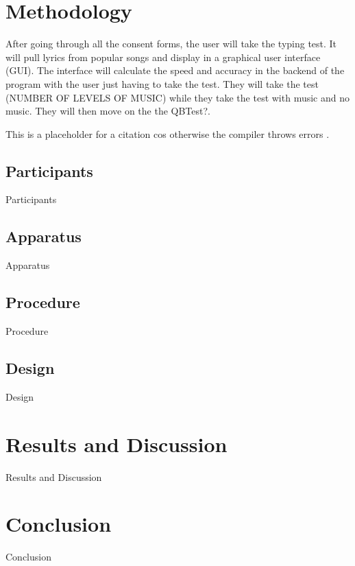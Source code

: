 \documentclass[sigconf]{acmart}
\begin{document}
\section{Methodology}
After going through all the consent forms, the user will take the typing test. It will pull lyrics from popular songs and display in a graphical user interface (GUI). 
The interface will calculate the speed and accuracy in the backend of the program with the user just having to take the test. They will take the test (NUMBER OF LEVELS OF MUSIC)
while they take the test with music and no music. They will then move on the the QBTest?. %

This is a placeholder for a citation cos otherwise the compiler throws errors \cite{AudioDistractionsAshley}.

\subsection[short]{Participants}
Participants

\subsection[short]{Apparatus}
Apparatus

\subsection[short]{Procedure}
Procedure

\subsection[short]{Design}
Design

\section{Results and Discussion}
Results and Discussion

\section{Conclusion}
Conclusion




\end{document}
